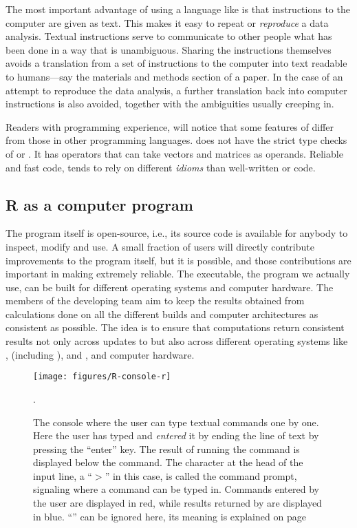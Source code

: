 \documentclass[krantz2]{krantz}\usepackage{knitr}
\begin{document}
The most important advantage of using a language like \Rlang is that instructions to the computer are given as text. This makes it easy to repeat or \emph{reproduce} a data analysis. Textual instructions serve to communicate to other people what has been done in a way that is unambiguous. Sharing the instructions themselves avoids a translation from a set of instructions to the computer into text readable to humans---say the materials and methods section of a paper. In the case of an attempt to reproduce the data analysis, a further translation back into computer instructions is also avoided, together with the ambiguities usually creeping in.

\begin{explainbox}
Readers with programming experience, will notice that some features of \Rlang differ from those in other programming languages. \Rlang does not have the strict type checks of  or \Cpplang. It has operators that can take vectors and matrices as operands. Reliable and fast \Rlang code, tends to rely on different \emph{idioms} than well-written  or \Cpplang code.
\end{explainbox}

\subsection{R as a computer program}
The \Rpgrm program itself is open-source, i.e., its source code is available for anybody to inspect, modify and use. A small fraction of users will directly contribute improvements to the \Rpgrm program itself, but it is possible, and those contributions are important in making \Rpgrm extremely reliable. The executable, the \Rpgrm program we actually use, can be built for different operating systems and computer hardware. The members of the \Rpgrm developing team aim to keep the results obtained from calculations done on all the different builds and computer architectures as consistent as possible. The idea is to ensure that computations return consistent results not only across updates to \Rpgrm but also across different operating systems like ,  (including ), and , and computer hardware.

\begin{figure}
  \centering
  \texttt{[image: figures/R-console-r]}
  \caption[The R console]{The \Rpgrm console where the user can type textual commands one by one. Here the user has typed  and \textit{entered} it by ending the line of text by pressing the ``enter'' key. The result of running the command is displayed below the command. The character at the head of the input line, a ``$>$'' in this case, is called the command prompt, signaling where a command can be typed in. Commands entered by the user are displayed in red, while results returned by \Rlang are displayed in blue. ``\code{[1]}'' can be ignored here, its meaning is explained on page \pageref{par:print:vec:index}}.\label{fig:intro:console}
\end{figure}
\end{document}
